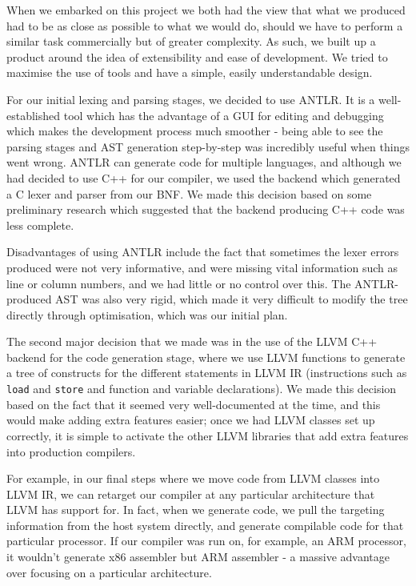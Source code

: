 \documentclass[a4wide, 11pt]{article}
\begin{document}
When we embarked on this project we both had the view that what we produced had to be as close as possible to what we would do, should we have to perform a similar task commercially but of greater complexity. As such, we built up a product around the idea of extensibility and ease of development. We tried to maximise the use of tools and have a simple, easily understandable design.

For our initial lexing and parsing stages, we decided to use ANTLR. It is a well-established tool which has the advantage of a GUI for editing and debugging which makes the development process much smoother - being able to see the parsing stages and AST generation step-by-step was incredibly useful when things went wrong. ANTLR can generate code for multiple languages, and although we had decided to use C++ for our compiler, we used the backend which generated a C lexer and parser from our BNF. We made this decision based on some preliminary research which suggested that the backend producing C++ code was less complete. 

Disadvantages of using ANTLR include the fact that sometimes the lexer errors produced were not very informative, and were missing vital information such as line or column numbers, and we had little or no control over this. The ANTLR-produced AST was also very rigid, which made it very difficult to modify the tree directly through optimisation, which was our initial plan.

The second major decision that we made was in the use of the LLVM C++ backend for the code generation stage, where we use LLVM functions to generate a tree of constructs for the different statements in LLVM IR (instructions such as \texttt{load} and \texttt{store} and function and variable declarations). We made this decision based on the fact that it seemed very well-documented at the time, and this would make adding extra features easier; once we had LLVM classes set up correctly, it is simple to activate the other LLVM libraries that add extra features into production compilers.

For example, in our final steps where we move code from LLVM classes into LLVM IR, we can retarget our compiler at any particular architecture that LLVM has support for. In fact, when we generate code, we pull the targeting information from the host system directly, and generate compilable code for that particular processor. If our compiler was run on, for example, an ARM processor, it wouldn't generate x86 assembler but ARM assembler - a massive advantage over focusing on a particular architecture.
\end{document}
